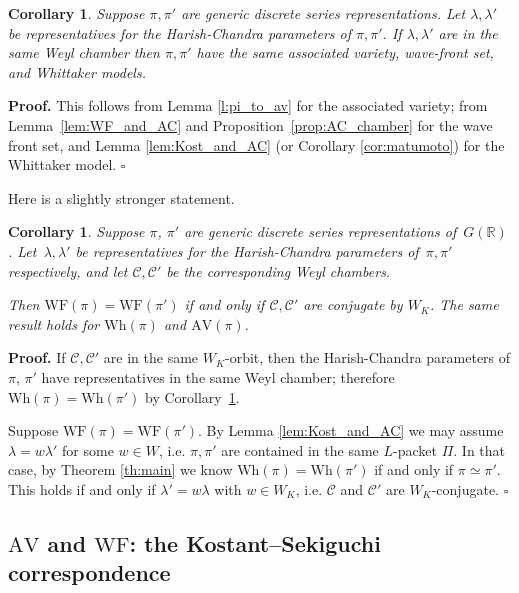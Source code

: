 \documentclass[10pt,leqno]{article}
\newtheorem{corollary}[equation]{Corollary}
\numberwithin{equation}{section}
\newcommand{\qed}{\hfill $\square$ \medskip}
\newenvironment{proof}[1][Proof]{\noindent\textbf{#1.} }{\qed}
\newcommand{\R}{\mathbb R}
\newcommand{\AV}{\mathrm{AV}}
\newcommand{\Wh}{\mathrm{Wh}}
\newcommand{\WF}{\mathrm{WF}}
\begin{document}
\begin{corollary}
\label{c:same}
Suppose $\pi,\pi'$ are generic discrete series representations. Let  $\lambda,\lambda'$ be representatives
for the Harish-Chandra parameters of $\pi,\pi'$. If 
$\lambda,\lambda'$ are in the same  Weyl chamber then
$\pi,\pi'$ have the same associated variety, wave-front set, and Whittaker models.
\end{corollary}

\begin{proof}
This follows from Lemma \ref{l:pi_to_av} for the associated variety;
from Lemma~\ref{lem:WF_and_AC} and Proposition~\ref{prop:AC_chamber} for the wave front set, and Lemma \ref{lem:Kost_and_AC} (or Corollary \ref{cor:matumoto})
for the Whittaker model.
\end{proof}

Here is a slightly stronger statement.

\begin{corollary}
\label{l:equalWhittaker}
Suppose $\pi$, $\pi'$ are generic discrete series representations of~$G(\R)$. Let~$\lambda, \lambda'$ be representatives for the Harish-Chandra parameters of~$\pi, \pi'$ respectively, and let $\mathscr{C}, \mathscr{C}'$ be the corresponding Weyl chambers. 

Then $\WF(\pi)=\WF(\pi')$ if and only if $\mathscr{C}, \mathscr{C}'$ are conjugate by $W_K$.
The same result holds for $\Wh(\pi)$ and $\AV(\pi)$. 
\end{corollary}

\begin{proof}
If  $\mathscr{C}, \mathscr{C}'$ are in the same $W_K$-orbit, then the Harish-Chandra parameters of $\pi$, $\pi'$ have representatives in the same Weyl chamber; therefore $\Wh(\pi)=\Wh(\pi')$ by Corollary~\ref{c:same}.

Suppose $\WF(\pi)=\WF(\pi')$. By Lemma \ref{lem:Kost_and_AC} we may assume
$\lambda=w\lambda'$ for some $w\in W$, i.e. $\pi,\pi'$ are contained
in the same $L$-packet $\Pi$. In that case, by Theorem \ref{th:main} 
we know $\Wh(\pi)=\Wh(\pi')$ if and only if $\pi\simeq \pi'$.
This holds if and only if $\lambda'=w\lambda$ with $w\in W_K$, 
i.e. $\mathscr{C}$ and $\mathscr{C}'$ are $W_K$-conjugate.
\end{proof}


\subsection{$\AV$ and $\WF$: the Kostant--Sekiguchi correspondence } \label{sec:Sekiguchi}
\end{document}
